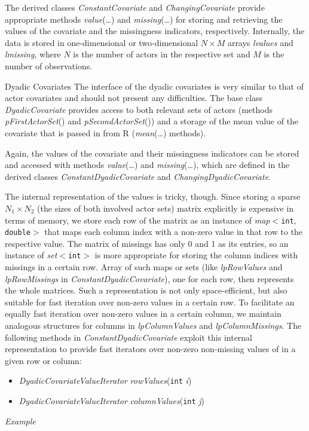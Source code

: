 \documentclass[12pt]{article}
\makeatletter
\renewcommand{\=}{\,=\,}
\newcommand{\+}{\,+\,}
\newcommand{\nnm}[1]{\textsf{\small\textit{#1}}}
\renewcommand{\subsubsection}{\@startsection{subsubsection}{3}
                {0pt}{0.7\baselineskip}{0.3\baselineskip}
                {\sffamily} }
\makeatother
\begin{document}
The derived classes \nnm{ConstantCovariate} and \nnm{ChangingCovariate} provide
appropriate methods \nnm{value}(\ldots) and \nnm{missing}(\ldots) for storing
and retrieving the values of the covariate and the missingness indicators,
respectively. Internally, the data is stored in one-dimensional or
two-dimensional $N \times M$ arrays \nnm{lvalues} and \nnm{lmissing}, where
$N$ is the number of actors in the respective set and $M$ is the number of
observations.

\subsubsection{Dyadic Covariates}
The interface of the dyadic covariates is very similar to that of actor
covariates and should not present any difficulties. The base class
\nnm{DyadicCovariate} provides access to both relevant sets of actors (methods
\nnm{pFirstActorSet}() and \nnm{pSecondActorSet}()) and a storage of the mean
value of the covariate that is passed in from R (\nnm{mean}(\ldots) methods).

Again, the values of the covariate and their missingness indicators can be
stored and accessed with methods \nnm{value}(\ldots) and \nnm{missing}(\ldots),
which are defined in the derived classes \nnm{ConstantDyadicCovariate} and
\nnm{ChangingDyadicCovariate}.

The internal representation of the values is tricky, though. Since storing
a sparse $N_1 \times N_2$ (the sizes of both involved actor sets) matrix
explicitly is expensive in terms of memory, we store each row of the matrix
as an instance of \nnm{map}$<$\verb|int|, \verb|double|$>$ that maps
each column index with a non-zero value in that row to the respective value.
The matrix of missings has only 0 and 1 as its entries, so an instance of
\nnm{set}$<$\verb|int|$>$ is more appropriate for storing the column indices
with missings in a certain row. Array of such maps or sets (like
\nnm{lpRowValues} and \nnm{lpRowMissings} in \nnm{ConstantDyadicCovariate}),
one for each row, then represents the whole matrices. Such a representation is
not only space-efficient, but also suitable for fast iteration over non-zero
values in a certain row. To facilitate an equally fast iteration over non-zero
values in a certain column, we maintain analogous structures for columns in
\nnm{lpColumnValues} and \nnm{lpColumnMissings}. The following methods in
\nnm{ConstantDyadicCovariate} exploit
this internal representation to provide fast iterators over non-zero non-missing
values of in a given row or column:
\begin{itemize}
\item \nnm{DyadicCovariateValueIterator} \nnm{rowValues}(\verb|int| \nnm{i})
\item \nnm{DyadicCovariateValueIterator} \nnm{columnValues}(\verb|int| \nnm{j})
\end{itemize}
%
\emph{Example}
\end{document}
